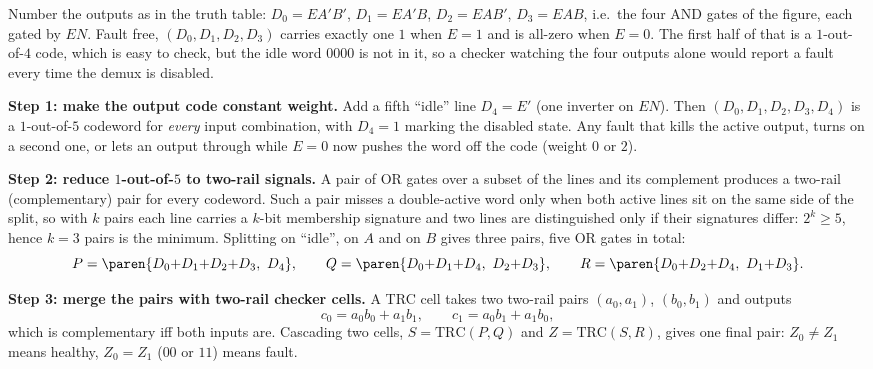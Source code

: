\documentclass[a4paper, 10pt]{article}
\begin{document}
\begin{solution}
	Number the outputs as in the truth table: $D_0 = E A'B'$, $D_1 = E A'B$,
	$D_2 = E AB'$, $D_3 = E AB$, i.e.\ the four AND gates of the figure, each
	gated by $EN$. Fault free, $(D_0,D_1,D_2,D_3)$ carries exactly one $1$
	when $E=1$ and is all-zero when $E=0$. The first half of that is a
	$1$-out-of-$4$ code, which is easy to check, but the idle word $0000$ is
	not in it, so a checker watching the four outputs alone would report a
	fault every time the demux is disabled.

	\myspace
	\textbf{Step 1: make the output code constant weight.} Add a fifth
	``idle'' line $D_4 = E'$ (one inverter on $EN$). Then
	$(D_0,D_1,D_2,D_3,D_4)$ is a $1$-out-of-$5$ codeword for \emph{every}
	input combination, with $D_4=1$ marking the disabled state. Any fault
	that kills the active output, turns on a second one, or lets an output
	through while $E=0$ now pushes the word off the code (weight $0$ or $2$).

	\myspace
	\textbf{Step 2: reduce $1$-out-of-$5$ to two-rail signals.} A pair of OR
	gates over a subset of the lines and its complement produces a two-rail
	(complementary) pair for every codeword. Such a pair misses a
	double-active word only when both active lines sit on the same side of
	the split, so with $k$ pairs each line carries a $k$-bit membership
	signature and two lines are distinguished only if their signatures
	differ: $2^k \ge 5$, hence $k = 3$ pairs is the minimum. Splitting on
	``idle'', on $A$ and on $B$ gives three pairs, five OR gates in total:
	\[
		P = \paren{D_0{+}D_1{+}D_2{+}D_3,\ D_4}, \qquad
		Q = \paren{D_0{+}D_1{+}D_4,\ D_2{+}D_3}, \qquad
		R = \paren{D_0{+}D_2{+}D_4,\ D_1{+}D_3}.
	\]

	\myspace
	\textbf{Step 3: merge the pairs with two-rail checker cells.} A TRC cell
	takes two two-rail pairs $(a_0,a_1)$, $(b_0,b_1)$ and outputs
	\[
		c_0 = a_0b_0 + a_1b_1, \qquad c_1 = a_0b_1 + a_1b_0,
	\]
	which is complementary iff both inputs are. Cascading two cells,
	$S = \mathrm{TRC}(P,Q)$ and $Z = \mathrm{TRC}(S,R)$, gives one final
	pair: $Z_0 \neq Z_1$ means healthy, $Z_0 = Z_1$ ($00$ or $11$) means
	fault.

	\begin{figure}[H]
		\centering
\end{figure}
\end{solution}
\end{document}

